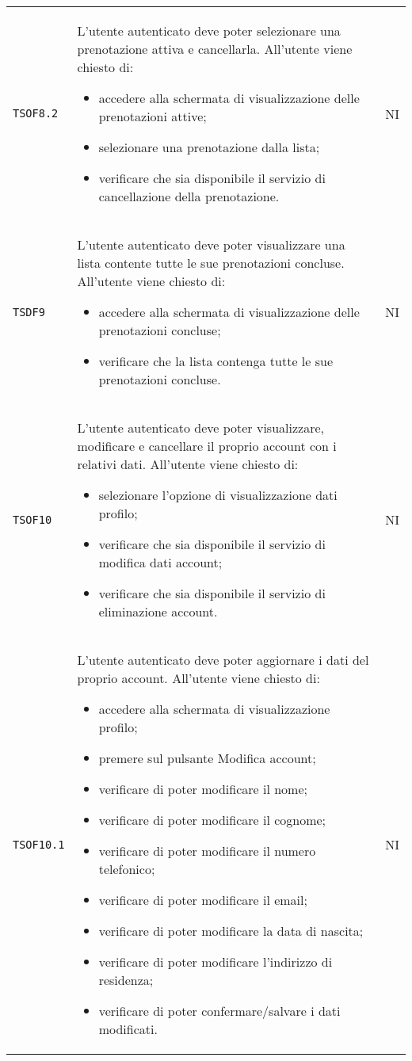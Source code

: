 \begin{longtable}{ >{\centering}p{} >{\centering}p{}
			>{\centering}p{}}
		 \texttt{TSOF8.2}	&	L'utente autenticato deve poter selezionare una prenotazione attiva e cancellarla. All'utente viene chiesto di:
		 \begin{itemize}
		 	\item accedere alla schermata di visualizzazione delle prenotazioni attive;
		 	\item selezionare una prenotazione dalla lista;
		 	\item verificare che sia disponibile il servizio di cancellazione della prenotazione.
		 \end{itemize}	&	NI	\tabularnewline
		 \texttt{TSDF9}&	L'utente autenticato deve poter visualizzare una lista contente tutte le sue prenotazioni concluse. All'utente viene chiesto di:
		 \begin{itemize}
		 	\item accedere alla schermata di visualizzazione delle prenotazioni concluse;
		 	\item verificare che la lista contenga tutte le sue prenotazioni concluse.
		 \end{itemize}	&	NI	\tabularnewline
		 \texttt{TSOF10}	&	L'utente autenticato deve poter visualizzare, modificare e cancellare il proprio account con i relativi dati. All'utente viene chiesto di:
		 \begin{itemize}
		 	\item selezionare l'opzione di visualizzazione dati profilo;
		 	\item verificare che sia disponibile il servizio di modifica dati account;
		 	\item verificare che sia disponibile il servizio di eliminazione account.
		 \end{itemize}	&	NI	\tabularnewline
		 
		 \texttt{TSOF10.1} & L'utente autenticato deve poter aggiornare i dati del proprio account. All'utente viene chiesto di:
		 \begin{itemize}
		 	\item accedere alla schermata di visualizzazione profilo;
		 	\item premere sul pulsante Modifica account;
		 	\item verificare di poter modificare il nome;
		 	\item verificare di poter modificare il cognome;
		 	\item verificare di poter modificare il numero telefonico;
		 	\item verificare di poter modificare il email;
		 	\item verificare di poter modificare la data di nascita;
		 	\item verificare di poter modificare l'indirizzo di residenza;
		 	\item verificare di poter confermare/salvare i dati modificati.
		 \end{itemize}	&	NI	\tabularnewline
		 

\end{longtable}
